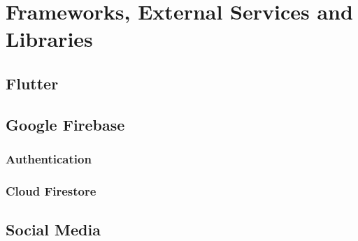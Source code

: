 \chapter{Frameworks, External Services and Libraries}

\section{Flutter}

\section{Google Firebase}
\subsection{Authentication}

\subsection{Cloud Firestore}

\section{Social Media}
